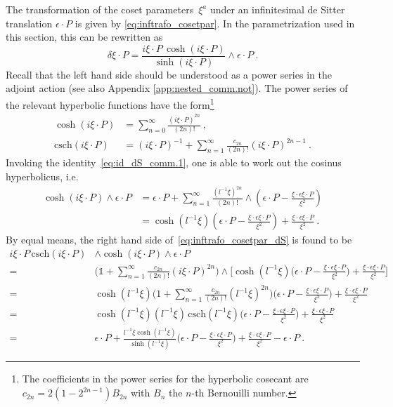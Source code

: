 \documentclass[11pt]{article}
\begin{document}
The transformation of the coset parameters~$\xi^a$ under an 
infinitesimal de Sitter translation $\epsilon\cdot P$ is given by 
\eqref{eq:inftrafo_cosetpar}. In the parametrization used in this 
section, this can be rewritten as
%
\begin{equation}\label{eq:inftrafo_cosetpar_dS}
	\delta\xi \cdot P = \frac{i\xi\cdot P\,\cosh(i\xi\cdot 
		P)}{\sinh(i\xi\cdot P)} \wedge \epsilon\cdot P~.
\end{equation}
Recall that the left hand side should be understood as a
power series in the adjoint action (see also Appendix 
\ref{app:nested_comm.not}).  The power series of the relevant 
hyperbolic functions have the form\footnote{The coefficients in 
	the power series for the hyperbolic cosecant are $c_{2n} = 
	2(1-2^{2n-1}) B_{2n}$ with $B_n$ the $n$-th Bernouilli 
	number.}
%
\begin{align*}
	\cosh(i\xi\cdot P) &= \sum_{n=0}^\infty \frac{(i\xi\cdot 
		P)^{2n}}{(2n)!}~, \\
	\mathrm{csch}(i\xi\cdot P) &= (i\xi\cdot P)^{-1} + 
	\sum_{n=1}^\infty \frac{c_{2n}}{(2n)!} (i\xi\cdot P)^{2n-1}~.
\end{align*}
%
Invoking the identity~\eqref{eq:id_dS_comm.1}, one is able to 
work out the cosinus hyperbolicus, i.e.~ 
%
\begin{equation}\label{eq:cosh_transl_dS}
\begin{split}
	\cosh(i\xi\cdot P) \wedge \epsilon\cdot P
	&= \epsilon\cdot P + \sum_{n=1}^\infty 
	\frac{(l^{-1}\xi)^{2n}}{(2n)!} \wedge \left(\epsilon\cdot P - 
		\frac{\xi\cdot\epsilon \xi\cdot P}{\xi^2} \right) \\
	&= \cosh(l^{-1}\xi) \left(\epsilon\cdot P - 
		\frac{\xi\cdot\epsilon \xi\cdot P}{\xi^2} \right) + 
	\frac{\xi\cdot\epsilon \xi\cdot P}{\xi^2}~.
\end{split}
\end{equation}
By equal means, the right hand side 
of~\eqref{eq:inftrafo_cosetpar_dS} is found to be
\begin{displaymath}
\begin{split}
	i\xi\cdot P \,\mathrm{csch}(i\xi\cdot P) &\wedge 
	\cosh(i\xi\cdot P) \wedge \epsilon\cdot P \\
	=& \bigg( \mathbb{1} + \sum_{n=1}^\infty \frac{c_{2n}}{(2n)!} 
	(i\xi\cdot P)^{2n} \bigg)\wedge \bigg[\cosh(l^{-1}\xi)
	\bigg(\epsilon\cdot P -\frac{\xi\cdot\epsilon \xi\cdot 
		P}{\xi^2}\bigg) + \frac{\xi\cdot\epsilon \xi\cdot P}{\xi^2} 
	\bigg] \\
	=& \cosh(l^{-1}\xi)\bigg(1 + \sum_{n=1}^\infty 
	\frac{c_{2n}}{(2n)!}(l^{-1}\xi)^{2n} \bigg) 
	\bigg(\epsilon\cdot P -\frac{\xi\cdot\epsilon \xi\cdot 
		P}{\xi^2}\bigg) + \frac{\xi\cdot\epsilon \xi\cdot P}{\xi^2} 
	\\
	=& \cosh(l^{-1}\xi)(l^{-1}\xi)\,\mathrm{csch}(l^{-1}\xi) 
	\bigg(\epsilon\cdot P -\frac{\xi\cdot\epsilon \xi\cdot 
		P}{\xi^2}\bigg) + \frac{\xi\cdot\epsilon \xi\cdot P}{\xi^2} 
	\\
	=& \epsilon\cdot P + \frac{l^{-1}\xi	
		\cosh(l^{-1}\xi)}{\sinh(l^{-1}\xi)} \bigg(\epsilon\cdot P - 
	\frac{\xi\cdot\epsilon \xi\cdot P}{\xi^2}\bigg) + 
	\frac{\xi\cdot\epsilon \xi\cdot P}{\xi^2} - \epsilon\cdot P ~.
\end{split}
\end{displaymath}
\end{document}
